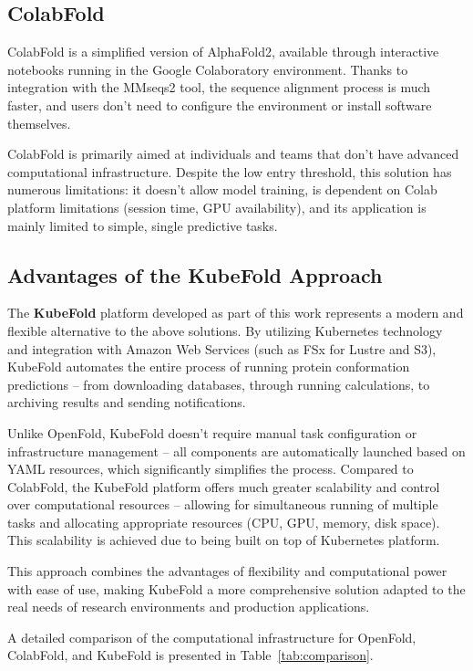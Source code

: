 \subsection*{ColabFold}

ColabFold is a simplified version of AlphaFold2, available through interactive notebooks running in the Google Colaboratory environment.
Thanks to integration with the MMseqs2 tool, the sequence alignment process is much faster, and users don't need to configure the environment or install software themselves.

ColabFold is primarily aimed at individuals and teams that don't have advanced computational infrastructure.
Despite the low entry threshold, this solution has numerous limitations: it doesn't allow model training, is dependent on Colab platform limitations (session time, GPU availability), and its application is mainly limited to simple, single predictive tasks.

\subsection*{Advantages of the KubeFold Approach}

The \textbf{KubeFold} platform developed as part of this work represents a modern and flexible alternative to the above solutions.
By utilizing Kubernetes technology and integration with Amazon Web Services (such as FSx for Lustre and S3), KubeFold automates the entire process of running protein conformation predictions – from downloading databases, through running calculations, to archiving results and sending notifications.

Unlike OpenFold, KubeFold doesn't require manual task configuration or infrastructure management – all components are automatically launched based on YAML resources, which significantly simplifies the process.
Compared to ColabFold, the KubeFold platform offers much greater scalability and control over computational resources – allowing for simultaneous running of multiple tasks and allocating appropriate resources (CPU, GPU, memory, disk space).
This scalability is achieved due to being built on top of Kubernetes platform.

This approach combines the advantages of flexibility and computational power with ease of use, making KubeFold a more comprehensive solution adapted to the real needs of research environments and production applications.

A detailed comparison of the computational infrastructure for OpenFold, ColabFold, and KubeFold is presented in Table~\ref{tab:comparison}.

